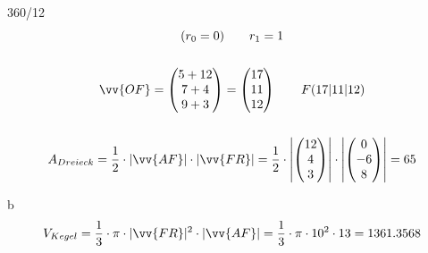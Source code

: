 \begin{exercise}{360/12}
\begin{gather*}
    (r_0 = 0) \qquad r_1 = 1 \\\\
    \vv{OF} = \begin{pmatrix}5 + 12 \\ 7 + 4 \\ 9 + 3\end{pmatrix} = \begin{pmatrix}17 \\ 11 \\ 12\end{pmatrix} \qquad F(17|11|12) \\\\
    A_{Dreieck} = \frac{1}{2} \cdot |\vv{AF}| \cdot |\vv{FR}| = \frac{1}{2} \cdot \left|\begin{pmatrix}12 \\ 4 \\ 3\end{pmatrix}\right| \cdot \left|\begin{pmatrix}0 \\ -6 \\ 8\end{pmatrix}\right| = 65
  \end{gather*}
  \item [b]
  \begin{gather*}
    V_{Kegel} = \frac{1}{3} \cdot \pi \cdot |\vv{FR}|^2 \cdot |\vv{AF}| = \frac{1}{3} \cdot \pi \cdot 10^2 \cdot 13 = 1361.3568
  \end{gather*}
\end{exercise}
